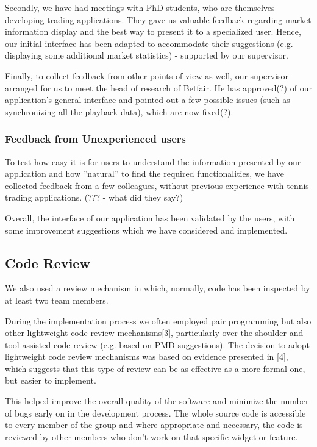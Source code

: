 \documentclass[10pt]{article}
\begin{document}
Secondly, we have had meetings with PhD students, who are themselves developing trading applications. They gave us valuable feedback regarding market information display and the best way to present it to a specialized user. Hence, our initial interface has been adapted to accommodate their suggestions (e.g. displaying some additional market statistics) - supported by our supervisor.

Finally, to collect feedback from other points of view as well, our supervisor arranged for us to meet the head of research of Betfair. He has approved(?) of our application's general interface and pointed out a few possible issues (such as synchronizing all the playback data), which are now fixed(?).

\subsubsection{Feedback from Unexperienced users}

To test how easy it is for users to understand the information presented by our application and how ''natural'' to find the required functionalities, we have collected feedback from a few colleagues, without previous experience with tennis trading applications. (??? - what did they say?)

Overall, the interface of our application has been validated by the users, with some improvement suggestions which we have considered and implemented.


\subsection{Code Review}

We also used a review mechanism in which, normally, code has been inspected by at least two team members.


During the implementation process we often employed pair programming but also other lightweight code review mechanisms[3], particularly over-the shoulder and tool-assisted code review (e.g. based on PMD suggestions).
The decision to adopt lightweight code review mechanisms was based on evidence presented in [4], which suggests that this type of review can be as effective as a more formal one, but easier to implement.

This helped improve the overall quality of the software and minimize the number of bugs early on in the development process.
The whole source code is accessible to every member of the group and where appropriate and necessary, the code is reviewed by other members who don’t work on that specific widget or feature. 
\end{document}
